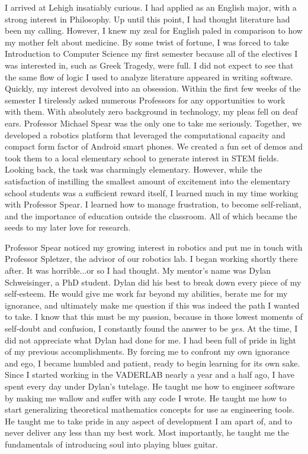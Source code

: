 \documentclass{article}
\begin{document}
I arrived at Lehigh insatiably curious. I had applied as an English major, with
a strong interest in Philosophy.  Up until this point, I had thought literature
had been my calling. However, I knew my zeal for English paled in
comparison to how my mother felt about medicine. By some twist of fortune, I
was forced to take Introduction to Computer Science my first semester because
all of the electives I was interested in, such as Greek Tragedy, were full. I
did not expect to see that the same flow of logic I used to analyze literature
appeared in writing software. Quickly, my interest devolved into an obsession.
Within the first few weeks of the semester I tirelessly asked numerous
Professors for any opportunities to work with them. With absolutely zero
background in technology, my pleas fell on deaf ears. Professor Michael Spear
was the only one to take me seriously. Together, we developed a robotics
platform that leveraged the computational capacity and compact form factor of
Android smart phones. We created a fun set of demos and took them to a local
elementary school to generate interest in STEM fields. Looking back, the task
was charmingly elementary. However, while the satisfaction of instilling the
smallest amount of excitement into the elementary school students was a
sufficient reward itself, I learned much in my time working with Professor
Spear.  I learned how to manage frustration, to become self-reliant, and the
importance of education outside the classroom. All of which became the seeds to
my later love for research.

Professor Spear noticed my growing interest in robotics and put me in touch
with Professor Spletzer, the advisor of our robotics lab. I began working
shortly there after. It was horrible...or so I had thought. My mentor's name
was Dylan Schweisinger, a PhD student. Dylan did his best to break down every
piece of my self-esteem. He would give me work far beyond my abilities, berate
me for my ignorance, and ultimately make me question if this was indeed the
path I wanted to take. I know that this must be my passion, because in those
lowest moments of self-doubt and confusion, I constantly found the answer to be
\emph{yes}. At the time, I did not appreciate what Dylan had done for me. I had
been full of pride in light of my previous accomplishments. By forcing me to
confront my own ignorance and ego, I became humbled and patient, ready to begin
learning for its own sake. Since I started working in the VADERLAB nearly a
year and a half ago, I have spent every day under Dylan's tutelage.  He taught
me how to engineer software by making me wallow and suffer with any code I
wrote. He taught me how to start generalizing theoretical mathematics concepts
for use as engineering tools. He taught me to take pride in any aspect of
development I am apart of, and to never deliver any less than my best work.
Most importantly, he taught me the fundamentals of introducing soul into
playing blues guitar. 
\end{document}

